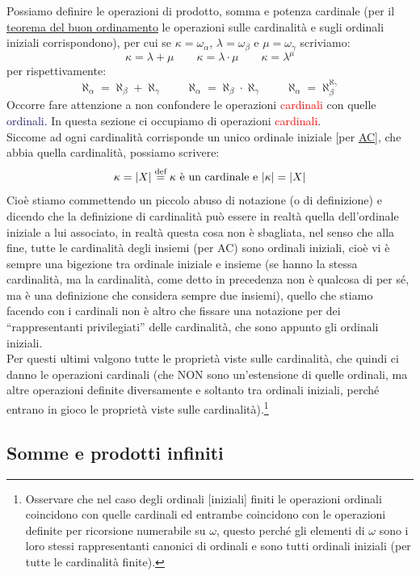Possiamo definire le operazioni di prodotto, somma e potenza cardinale (per il \hyperref[buon_ordinamento]{teorema del buon ordinamento} le operazioni sulle cardinalit\`a e sugli ordinali iniziali corrispondono), per cui se $\kappa = \omega_\alpha$, $\lambda = \omega_\beta$ e $\mu = \omega_\gamma$ scriviamo:
\[ \kappa =  \lambda + \mu \qquad \kappa = \lambda \cdot \mu \qquad \kappa = \lambda^\mu
	\]
per rispettivamente:
\[ \aleph_\alpha = \aleph_\beta + \aleph_\gamma \qquad \aleph_\alpha = \aleph_\beta \cdot \aleph_\gamma \qquad \aleph_\alpha = \aleph_\beta^{\aleph_\gamma}
	\]
Occorre fare attenzione a non confondere le operazioni \textcolor{red}{cardinali} con quelle \textcolor{MidnightBlue}{ordinali}. In questa sezione ci occupiamo di operazioni \textcolor{red}{cardinali}.\\
Siccome ad ogni cardinalit\`a corrisponde un unico ordinale iniziale [per \hyperref[ax9]{AC}], che abbia quella cardinalit\`a, possiamo scrivere:
\[ \kappa = |X| \overset{\text{def}}{=} \text{$\kappa$ \`e un cardinale e $|\kappa| = |X|$}
	\]
Cio\`e stiamo commettendo un piccolo abuso di notazione (o di definizione) e dicendo che la definizione di cardinalit\`a pu\`o essere in realt\`a quella dell'ordinale iniziale a lui associato, in realt\`a questa cosa non \`e sbagliata, nel senso che alla fine, tutte le cardinalit\`a degli insiemi (per AC) sono ordinali iniziali, cio\`e vi \`e sempre una bigezione tra ordinale iniziale e insieme (se hanno la stessa cardinalit\`a, ma la cardinalit\`a, come detto in precedenza non \`e qualcosa di per s\'e, ma \`e una definizione che 
considera sempre due insiemi), quello che stiamo facendo con i cardinali non \`e altro che fissare una notazione per dei ``rappresentanti privilegiati'' delle cardinalit\`a, che sono appunto gli ordinali iniziali.\\
Per questi ultimi valgono tutte le propriet\`a viste sulle cardinalit\`a, che quindi ci danno le operazioni cardinali (che NON sono un'estensione di quelle ordinali, ma altre operazioni definite diversamente e soltanto tra ordinali iniziali, perch\'e entrano in gioco le propriet\`a viste sulle cardinalit\`a).\footnote{Osservare che nel caso degli ordinali [iniziali] finiti le operazioni ordinali coincidono con quelle cardinali ed entrambe coincidono con le operazioni definite per ricorsione numerabile su $\omega$, questo 
perch\'e gli elementi di $\omega$ sono i loro stessi rappresentanti canonici di ordinali e sono tutti ordinali iniziali (per tutte le cardinalit\`a finite).}
\subsection{Somme e prodotti infiniti}

